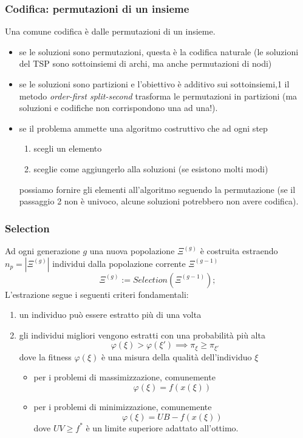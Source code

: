 \documentclass{article}
\begin{document}
\subsubsection{Codifica: permutazioni di un insieme}
Una comune codifica è dalle permutazioni di un insieme.
\begin{itemize}
    \item se le soluzioni sono permutazioni, questa è la codifica naturale
    (le soluzioni del TSP sono sottoinsiemi di archi, ma anche permutazioni di nodi)
    \item se le soluzioni sono partizioni e l'obiettivo è additivo sui sottoinsiemi,1
    il metodo \textit{order-first split-second} trasforma le permutazioni in partizioni
    (ma soluzioni e codifiche non corrispondono una ad una!).
    \item se il problema ammette una algoritmo costruttivo che ad ogni step
    \begin{enumerate}
        \item scegli un elemento
        \item sceglie come aggiungerlo alla soluzioni (se esistono molti modi)
    \end{enumerate}
    possiamo fornire gli elementi all'algoritmo seguendo la permutazione (se il
    passaggio 2 non è univoco, alcune soluzioni potrebbero non avere codifica).
\end{itemize}

\subsubsection{Selection}
Ad ogni generazione $g$ una nuova popolazione $\Xi^{(g)}$ è costruita estraendo
$n_p=|\Xi^{(g)}|$ individui dalla popolazione corrente $\Xi^(g-1)$
$$\Xi^{(g)}:=Selection(\Xi^{(g-1)});$$
L'estrazione segue i seguenti criteri fondamentali:
\begin{enumerate}
    \item un individuo può essere estratto più di una volta
    \item gli individui migliori vengono estratti con una probabilità più alta
    $$\varphi(\xi)>\varphi(\xi')\implies\pi_\xi\geq\pi_{\xi'}$$
    dove la fitness $\varphi(\xi)$ è una misura della qualità dell'individuo $\xi$
    \begin{itemize}
        \item per i problemi di massimizzazione, comunemente
        $$\varphi(\xi)=f(x(\xi))$$
        \item per i problemi di minimizzazione, comunemente
        $$\varphi(\xi)=UB-f(x(\xi))$$
        dove $UV\geq f^*$ è un limite superiore adattato all'ottimo.
    \end{itemize}
\end{enumerate}
\end{document}
